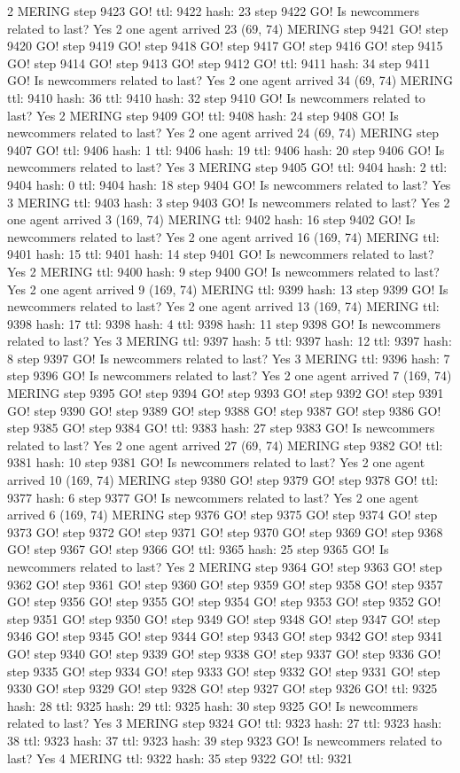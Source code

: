 2 MERING step 9423 GO! ttl: 9422 hash: 23 step 9422 GO! Is newcommers related to last? Yes 2 one agent arrived 23 (69, 74) MERING step 9421 GO! step 9420 GO! step 9419 GO! step 9418 GO! step 9417 GO! step 9416 GO! step 9415 GO! step 9414 GO! step 9413 GO! step 9412 GO! ttl: 9411 hash: 34 step 9411 GO! Is newcommers related to last? Yes 2 one agent arrived 34 (69, 74) MERING ttl: 9410 hash: 36 ttl: 9410 hash: 32 step 9410 GO! Is newcommers related to last? Yes 2 MERING step 9409 GO! ttl: 9408 hash: 24 step 9408 GO! Is newcommers related to last? Yes 2 one agent arrived 24 (69, 74) MERING step 9407 GO! ttl: 9406 hash: 1 ttl: 9406 hash: 19 ttl: 9406 hash: 20 step 9406 GO! Is newcommers related to last? Yes 3 MERING step 9405 GO! ttl: 9404 hash: 2 ttl: 9404 hash: 0 ttl: 9404 hash: 18 step 9404 GO! Is newcommers related to last? Yes 3 MERING ttl: 9403 hash: 3 step 9403 GO! Is newcommers related to last? Yes 2 one agent arrived 3 (169, 74) MERING ttl: 9402 hash: 16 step 9402 GO! Is newcommers related to last? Yes 2 one agent arrived 16 (169, 74) MERING ttl: 9401 hash: 15 ttl: 9401 hash: 14 step 9401 GO! Is newcommers related to last? Yes 2 MERING ttl: 9400 hash: 9 step 9400 GO! Is newcommers related to last? Yes 2 one agent arrived 9 (169, 74) MERING ttl: 9399 hash: 13 step 9399 GO! Is newcommers related to last? Yes 2 one agent arrived 13 (169, 74) MERING ttl: 9398 hash: 17 ttl: 9398 hash: 4 ttl: 9398 hash: 11 step 9398 GO! Is newcommers related to last? Yes 3 MERING ttl: 9397 hash: 5 ttl: 9397 hash: 12 ttl: 9397 hash: 8 step 9397 GO! Is newcommers related to last? Yes 3 MERING ttl: 9396 hash: 7 step 9396 GO! Is newcommers related to last? Yes 2 one agent arrived 7 (169, 74) MERING step 9395 GO! step 9394 GO! step 9393 GO! step 9392 GO! step 9391 GO! step 9390 GO! step 9389 GO! step 9388 GO! step 9387 GO! step 9386 GO! step 9385 GO! step 9384 GO! ttl: 9383 hash: 27 step 9383 GO! Is newcommers related to last? Yes 2 one agent arrived 27 (69, 74) MERING step 9382 GO! ttl: 9381 hash: 10 step 9381 GO! Is newcommers related to last? Yes 2 one agent arrived 10 (169, 74) MERING step 9380 GO! step 9379 GO! step 9378 GO! ttl: 9377 hash: 6 step 9377 GO! Is newcommers related to last? Yes 2 one agent arrived 6 (169, 74) MERING step 9376 GO! step 9375 GO! step 9374 GO! step 9373 GO! step 9372 GO! step 9371 GO! step 9370 GO! step 9369 GO! step 9368 GO! step 9367 GO! step 9366 GO! ttl: 9365 hash: 25 step 9365 GO! Is newcommers related to last? Yes 2 MERING step 9364 GO! step 9363 GO! step 9362 GO! step 9361 GO! step 9360 GO! step 9359 GO! step 9358 GO! step 9357 GO! step 9356 GO! step 9355 GO! step 9354 GO! step 9353 GO! step 9352 GO! step 9351 GO! step 9350 GO! step 9349 GO! step 9348 GO! step 9347 GO! step 9346 GO! step 9345 GO! step 9344 GO! step 9343 GO! step 9342 GO! step 9341 GO! step 9340 GO! step 9339 GO! step 9338 GO! step 9337 GO! step 9336 GO! step 9335 GO! step 9334 GO! step 9333 GO! step 9332 GO! step 9331 GO! step 9330 GO! step 9329 GO! step 9328 GO! step 9327 GO! step 9326 GO! ttl: 9325 hash: 28 ttl: 9325 hash: 29 ttl: 9325 hash: 30 step 9325 GO! Is newcommers related to last? Yes 3 MERING step 9324 GO! ttl: 9323 hash: 27 ttl: 9323 hash: 38 ttl: 9323 hash: 37 ttl: 9323 hash: 39 step 9323 GO! Is newcommers related to last? Yes 4 MERING ttl: 9322 hash: 35 step 9322 GO! ttl: 9321 